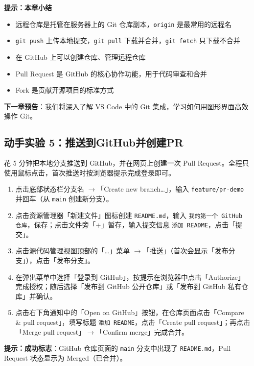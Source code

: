 \documentclass[12pt,a4paper,openany]{ctexbook}
\begin{document}
\noindent\textbf{提示：}\textbf{本章小结}
\begin{itemize}
  \item 远程仓库是托管在服务器上的 Git 仓库副本，\texttt{origin} 是最常用的远程名
  \item \texttt{git push} 上传本地提交，\texttt{git pull} 下载并合并，\texttt{git fetch} 只下载不合并
  \item 在 GitHub 上可以创建仓库、管理远程仓库
  \item Pull Request 是 GitHub 的核心协作功能，用于代码审查和合并
  \item Fork 是贡献开源项目的标准方式
\end{itemize}
\medskip

\textbf{下一章预告}：我们将深入了解 VS Code 中的 Git 集成，学习如何用图形界面高效操作 Git。

\subsection*{动手实验 5：推送到GitHub并创建PR}

花 5 分钟把本地分支推送到 GitHub，并在网页上创建一次 Pull Request。全程只使用鼠标点击，首次推送时按浏览器提示完成登录即可。

\medskip
\begin{enumerate}[leftmargin=1.5em]
  \item 点击底部状态栏分支名 $\to$「Create new branch…」，输入 \texttt{feature/pr-demo} 并回车（从 \texttt{main} 创建新分支）。
  \item 点击资源管理器「新建文件」图标创建 \texttt{README.md}，输入 \texttt{我的第一个 GitHub 仓库}，保存；点击文件旁「+」暂存，输入提交信息 \texttt{添加 README}，点击「提交」。
  \item 点击源代码管理视图顶部的「…」菜单 $\to$「推送」（首次会显示「发布分支」），点击「发布分支」。
  \item 在弹出菜单中选择「登录到 GitHub」，按提示在浏览器中点击「Authorize」完成授权；随后选择「发布到 GitHub 公开仓库」或「发布到 GitHub 私有仓库」并确认。
  \item 点击右下角通知中的「Open on GitHub」按钮，在仓库页面点击「Compare \& pull request」，填写标题 \texttt{添加 README}，点击「Create pull request」；再点击「Merge pull request」$\to$「Confirm merge」完成合并。
\end{enumerate}
\medskip

\noindent\textbf{提示：}\textbf{成功标志}：GitHub 仓库页面的 \texttt{main} 分支中出现了 \texttt{README.md}，Pull Request 状态显示为 Merged（已合并）。
\end{document}
